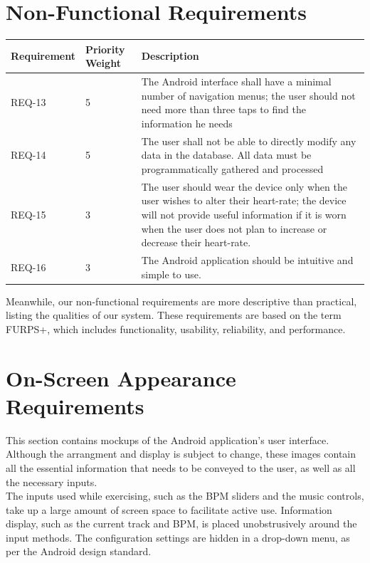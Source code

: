 \documentclass[letterpaper,english, 12pt]{scrreprt}
\begin{document}
\section{Non-Functional Requirements}
\begin{center}
	\begin{tabular}{|C{2cm}|C{2cm}|C{8cm}|}
		\hline
			Requirement & Priority Weight & Description \\
		\hline
			REQ-13 & 5 & The Android interface shall have a minimal number of navigation menus; the user should not need more than three taps to find the information he needs \\
		\hline
			REQ-14 & 5 & The user shall not be able to directly modify any data in the database. All data must be programmatically gathered and processed \\
		\hline
			REQ-15 & 3 & The user should wear the device only when the user wishes to alter their heart-rate; the device will not provide useful information if it is worn when the user does not plan to increase or decrease their heart-rate. \\
		\hline
			REQ-16 & 3 & The Android application should be intuitive and simple to use. \\
		\hline
	\end{tabular}
\end{center}

Meanwhile, our non-functional requirements are more descriptive than practical,
listing the qualities of our system. These requirements are based on the term
FURPS+, which includes functionality, usability, reliability, and performance.

\section{On-Screen Appearance Requirements}

This section contains mockups of the Android application's user interface.
Although the arrangment and display is subject to change, these images contain all the essential information that needs to be conveyed to the user, as well as all the necessary inputs. \\
The inputs used while exercising, such as the BPM sliders and the music controls, take up a large amount of screen space to facilitate active use. Information display, such as the current track and BPM, is placed unobstrusively around the input methods. The configuration settings are hidden in a drop-down menu, as per the Android design standard.\\
\end{document}
